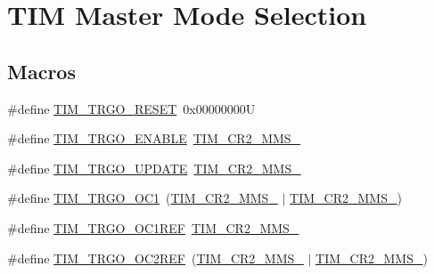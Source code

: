 \hypertarget{group___t_i_m___master___mode___selection}{}\section{T\+IM Master Mode Selection}
\label{group___t_i_m___master___mode___selection}
\subsection*{Macros}
\begin{DoxyCompactItemize}
\item 
\#define \hyperlink{group___t_i_m___master___mode___selection_ga32a8e436f2c0818a657b0d3fcf4e872d}{T\+I\+M\+\_\+\+T\+R\+G\+O\+\_\+\+R\+E\+S\+ET}~0x00000000U
\item 
\#define \hyperlink{group___t_i_m___master___mode___selection_ga4ac300b0fd24d1e6532e5961680a39a9}{T\+I\+M\+\_\+\+T\+R\+G\+O\+\_\+\+E\+N\+A\+B\+LE}~\hyperlink{group___peripheral___registers___bits___definition_gaf3e55308e84106d6501201e66bd46ab6}{T\+I\+M\+\_\+\+C\+R2\+\_\+\+M\+M\+S\+\_}
\item 
\#define \hyperlink{group___t_i_m___master___mode___selection_ga27521aebd507e562fe7fba6dfc639a67}{T\+I\+M\+\_\+\+T\+R\+G\+O\+\_\+\+U\+P\+D\+A\+TE}~\hyperlink{group___peripheral___registers___bits___definition_ga4b1036929b0a4ba5bd5cced9b8e0f4c3}{T\+I\+M\+\_\+\+C\+R2\+\_\+\+M\+M\+S\+\_}
\item 
\#define \hyperlink{group___t_i_m___master___mode___selection_ga80aa9a9c41de509d99fc4cb492d6513f}{T\+I\+M\+\_\+\+T\+R\+G\+O\+\_\+\+O\+C1}~(\hyperlink{group___peripheral___registers___bits___definition_ga4b1036929b0a4ba5bd5cced9b8e0f4c3}{T\+I\+M\+\_\+\+C\+R2\+\_\+\+M\+M\+S\+\_} $\vert$ \hyperlink{group___peripheral___registers___bits___definition_gaf3e55308e84106d6501201e66bd46ab6}{T\+I\+M\+\_\+\+C\+R2\+\_\+\+M\+M\+S\+\_})
\item 
\#define \hyperlink{group___t_i_m___master___mode___selection_gaed715aa7ec4ad0f7f5d82dde6d964178}{T\+I\+M\+\_\+\+T\+R\+G\+O\+\_\+\+O\+C1\+R\+EF}~\hyperlink{group___peripheral___registers___bits___definition_gacb74a815afdd856d51cfcf1ddf3fce6a}{T\+I\+M\+\_\+\+C\+R2\+\_\+\+M\+M\+S\+\_}
\item 
\#define \hyperlink{group___t_i_m___master___mode___selection_gaaedc4b3f4c5c3c8b45a2cf1b73e33c0a}{T\+I\+M\+\_\+\+T\+R\+G\+O\+\_\+\+O\+C2\+R\+EF}~(\hyperlink{group___peripheral___registers___bits___definition_gacb74a815afdd856d51cfcf1ddf3fce6a}{T\+I\+M\+\_\+\+C\+R2\+\_\+\+M\+M\+S\+\_} $\vert$ \hyperlink{group___peripheral___registers___bits___definition_gaf3e55308e84106d6501201e66bd46ab6}{T\+I\+M\+\_\+\+C\+R2\+\_\+\+M\+M\+S\+\_})

\end{DoxyCompactItemize}
